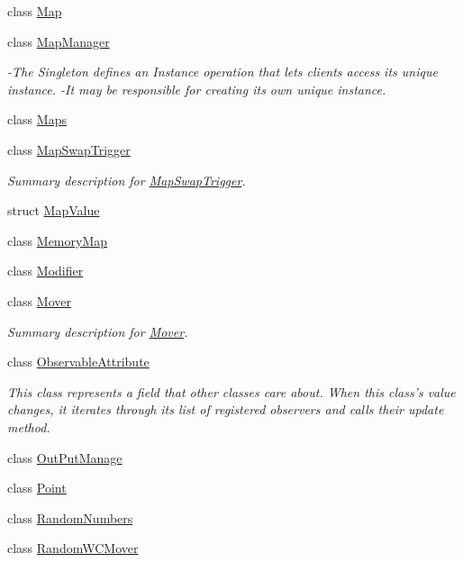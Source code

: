 \begin{DoxyCompactItemize}
class \hyperlink{class_s_e_a_r_c_h_1_1_map}{Map}
\item 
class \hyperlink{class_s_e_a_r_c_h_1_1_map_manager}{Map\-Manager}
\begin{DoxyCompactList}\small\item\em -\/\-The Singleton defines an Instance operation that lets clients access its unique instance. -\/\-It may be responsible for creating its own unique instance. \end{DoxyCompactList}\item 
class \hyperlink{class_s_e_a_r_c_h_1_1_maps}{Maps}
\item 
class \hyperlink{class_s_e_a_r_c_h_1_1_map_swap_trigger}{Map\-Swap\-Trigger}
\begin{DoxyCompactList}\small\item\em Summary description for \hyperlink{class_s_e_a_r_c_h_1_1_map_swap_trigger}{Map\-Swap\-Trigger}. \end{DoxyCompactList}\item 
struct \hyperlink{struct_s_e_a_r_c_h_1_1_map_value}{Map\-Value}
\item 
class \hyperlink{class_s_e_a_r_c_h_1_1_memory_map}{Memory\-Map}
\item 
class \hyperlink{class_s_e_a_r_c_h_1_1_modifier}{Modifier}
\item 
class \hyperlink{class_s_e_a_r_c_h_1_1_mover}{Mover}
\begin{DoxyCompactList}\small\item\em Summary description for \hyperlink{class_s_e_a_r_c_h_1_1_mover}{Mover}. \end{DoxyCompactList}\item 
class \hyperlink{class_s_e_a_r_c_h_1_1_observable_attribute}{Observable\-Attribute}
\begin{DoxyCompactList}\small\item\em This class represents a field that other classes care about. When this class's value changes, it iterates through its list of registered observers and calls their update method. \end{DoxyCompactList}\item 
class \hyperlink{class_s_e_a_r_c_h_1_1_out_put_manage}{Out\-Put\-Manage}
\item 
class \hyperlink{class_s_e_a_r_c_h_1_1_point}{Point}
\item 
class \hyperlink{class_s_e_a_r_c_h_1_1_random_numbers}{Random\-Numbers}
\item 
class \hyperlink{class_s_e_a_r_c_h_1_1_random_w_c_mover}{Random\-W\-C\-Mover}

\end{DoxyCompactItemize}
